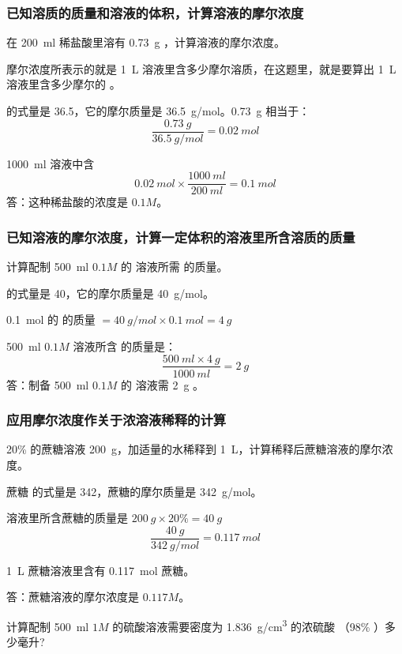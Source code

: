 \subsubsection{已知溶质的质量和溶液的体积，计算溶液的摩尔浓度}
\begin{example}
在 \qty{200}{ml} 稀盐酸里溶有 \qty{0.73}{g} ，计算溶液的摩尔浓度。
\end{example}
摩尔浓度所表示的就是 \qty{1}{L} 溶液里含多少摩尔溶质，在这题里，就是要算出 \qty{1}{L} 溶液里含多少摩尔的 。
\begin{solution}
 的式量是 36.5，它的摩尔质量是 \qty{36.5}{g/mol}。\qty{0.73}{g}  相当于：
\[ \frac{\qty{0.73}{g}}{\qty{36.5}{g/mol}} = \qty{0.02}{mol}\]

\qty{1000}{ml} 溶液中含 
\[ \qty{0.02}{mol} \times \frac{\qty{1000}{ml}}{\qty{200}{ml}} = \qty{0.1}{mol}\]
答：这种稀盐酸的浓度是 $0.1M$。
\end{solution}

\subsubsection{已知溶液的摩尔浓度，计算一定体积的溶液里所含溶质的质量}
\begin{example}
  计算配制 \qty{500}{ml} $0.1M$ 的  溶液所需  的质量。
\end{example}
\begin{solution}
   的式量是 40，它的摩尔质量是 \qty{40}{g/mol}。

  \qty{0.1}{mol} 的  的质量 $= \qty{40}{g/mol} \times \qty{0.1}{mol}=\qty{4}{g}$

  \qty{500}{ml} $0.1M$  溶液所含  的质量是：
  \[ \frac{\qty{500}{ml}\times\qty{4}{g}}{\qty{1000}{ml}} =\qty{2}{g}\]
  答：制备 \qty{500}{ml} $0.1M$ 的  溶液需 \qty{2}{g} 。
\end{solution}

\subsubsection{应用摩尔浓度作关于浓溶液稀释的计算}
\begin{example}
  20\% 的蔗糖溶液 \qty{200}{g}，加适量的水稀释到 \qty{1}{L}，计算稀释后蔗糖溶液的摩尔浓度。
\end{example}
\begin{solution}
  蔗糖  的式量是 342，蔗糖的摩尔质量是 \qty{342}{g/mol}。

  溶液里所含蔗糖的质量是 $\qty{200}{g} \times 20\% = \qty{40}{g}$
  \[\frac{\qty{40}{g}}{\qty{342}{g/mol}}=\qty{0.117}{mol}\]

  \qty{1}{L} 蔗糖溶液里含有 \qty{0.117}{mol} 蔗糖。

\noindent 答：蔗糖溶液的摩尔浓度是 $0.117M$。
\end{solution}
\begin{example}
  计算配制 \qty{500}{ml} $1M$ 的硫酸溶液需要密度为 \qty{1.836}{g/cm^3} 的浓硫酸 （98\% ）多少毫升?
\end{example}

